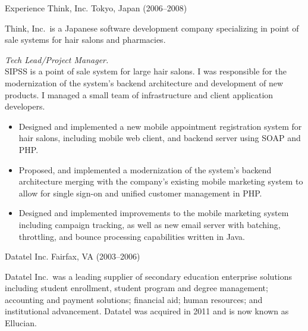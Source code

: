 \documentclass{resume}
\begin{document}
\begin{category}{Experience}
     Think, Inc. Tokyo, Japan (2006--2008)

    Think, Inc.\ is a Japanese software development company specializing in point
    of sale systems for hair salons and pharmacies.

    \begin{itemize}

         \emph{Tech Lead/Project Manager.}\\
            SIPSS is a point of sale system for large hair salons. I was
            responsible for the modernization of the system's backend
            architecture and development of new products. I managed a small team
            of infrastructure and client application developers.

        \begin{itemize}

            \item Designed and implemented a new mobile appointment registration
                system for hair salons, including mobile web client, and backend
                server using SOAP and PHP.\@

            \item Proposed, and implemented a modernization of the system's
                backend architecture merging with the company's existing mobile
                marketing system to allow for single sign-on and unified
                customer management in PHP.\@

            \item Designed and implemented improvements to the mobile marketing
                system including campaign tracking, as well as new email server
                with batching, throttling, and bounce processing capabilities
                written in Java.

        \end{itemize}

    \end{itemize}

     Datatel Inc. Fairfax, VA (2003--2006)

    Datatel Inc.\ was a leading supplier of secondary education enterprise
    solutions including student enrollment, student program and degree
    management; accounting and payment solutions; financial aid; human
    resources; and institutional advancement. Datatel was acquired in
    2011 and is now known as Ellucian.


\end{category}
\end{document}
